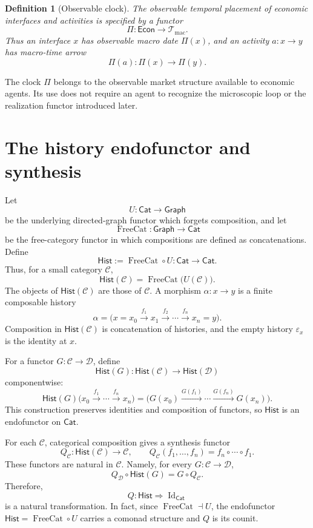 \documentclass[11pt,a4paper]{article}
\newtheorem{definition}{Definition}[section]
\newcommand{\Econ}{\mathsf{Econ}}
\newcommand{\Cat}{\mathsf{Cat}}
\newcommand{\Graph}{\mathsf{Graph}}
\newcommand{\Hist}{\mathsf{Hist}}
\newcommand{\FreeCat}{\operatorname{FreeCat}}
\newcommand{\Tmac}{\mathcal T_{\mathrm{mac}}}
\begin{document}
\begin{definition}[Observable clock]
The observable temporal placement of economic interfaces and activities is
specified by a functor
\[
  \Pi:\Econ\longrightarrow\Tmac.
  \tag{P}
\]
Thus an interface \(x\) has observable macro date \(\Pi(x)\), and an activity
\(a:x\to y\) has macro-time arrow
\[
  \Pi(a):\Pi(x)\longrightarrow\Pi(y).
\]
\end{definition}

The clock \(\Pi\) belongs to the observable market structure available to
economic agents.  Its use does not require an agent to recognize the
microscopic loop or the realization functor introduced later.


\section{The history endofunctor and synthesis}
\label{sec:hidtoryEndofunctor}

Let
\[
  U:\Cat\longrightarrow\Graph
\]
be the underlying directed-graph functor which forgets composition,
and let
\[
  \FreeCat:\Graph\longrightarrow\Cat
\]
be the free-category functor in which compositions are defined as concatenations. 
Define
\[
  \Hist:=\FreeCat\circ U:\Cat\longrightarrow\Cat.
\]
Thus, for a small category \(\mathcal C\),
\[
  \Hist(\mathcal C)=\FreeCat\bigl(U(\mathcal C)\bigr).
\]
The objects of \(\Hist(\mathcal C)\) are those of \(\mathcal C\). A
morphism \(\alpha:x\to y\) is a finite composable history
\[
  \alpha=
  \bigl(
  x=x_0\xrightarrow{f_1}x_1
  \xrightarrow{f_2}\cdots
  \xrightarrow{f_n}x_n=y
  \bigr).
\]
Composition in \(\Hist(\mathcal C)\) is concatenation of histories, and
the empty history \(\varepsilon_x\) is the identity at \(x\).

For a functor \(G:\mathcal C\to\mathcal D\), define
\[
  \Hist(G):
  \Hist(\mathcal C)\longrightarrow\Hist(\mathcal D)
\]
componentwise:
\[
  \Hist(G)
  \bigl(
  	x_0
		\xrightarrow{f_1}
	\cdots
  		\xrightarrow{f_n}
	x_n
  \bigr)
=
  \bigl(
  	G(x_0)
		\xrightarrow{G(f_1)}
	\cdots
  		\xrightarrow{G(f_n)}
	G(x_n)
  \bigr) .
\]
This construction preserves identities and composition of functors, so
\(\Hist\) is an endofunctor on \(\Cat\).

For each \(\mathcal C\), categorical composition gives a synthesis functor
\[
  Q_{\mathcal C}:
  \Hist(\mathcal C)\longrightarrow\mathcal C,
  \qquad
  Q_{\mathcal C}(f_1,\ldots,f_n)
  =
  f_n\circ\cdots\circ f_1.
\]
These functors are natural in \(\mathcal C\). Namely, for every
\(G:\mathcal C\to\mathcal D\),
\[
  Q_{\mathcal D}\circ\Hist(G)
  =
  G\circ Q_{\mathcal C}.
  \tag{N}
\]
Therefore,
\[
  Q:\Hist\Longrightarrow\operatorname{Id}_{\Cat}
\]
is a natural transformation. In fact, since
\(\FreeCat\dashv U\), the endofunctor \(\Hist=\FreeCat\circ U\)
carries a comonad structure and \(Q\) is its counit.
\end{document}
